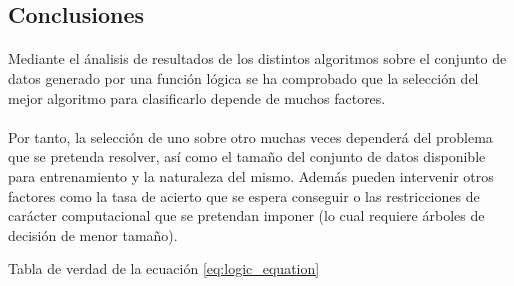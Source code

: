 \documentclass[10pt, a4paper,spanish]{article}
\begin{document}
		\subsection{Conclusiones}

			\paragraph{}
			Mediante el ánalisis de resultados de los distintos algoritmos sobre el conjunto de datos generado por una función lógica se ha comprobado que la selección del mejor algoritmo para clasificarlo depende de muchos factores.

			\paragraph{}
			Por tanto, la selección de uno sobre otro muchas veces dependerá del problema que se pretenda resolver, así como el tamaño del conjunto de datos disponible para entrenamiento y la naturaleza del mismo. Además pueden intervenir otros factores como la tasa de acierto que se espera conseguir o las restricciones de carácter computacional que se pretendan imponer (lo cual requiere árboles de decisión de menor tamaño).



			\begin{table}[p]
				\begin{center}
				\end{center}
				\caption{Tabla de verdad de la ecuación \ref{eq:logic_equation}}
				\label{eq:truth_table}
			\end{table}


	\nocite{subject:taa}
  
  
\end{document}
